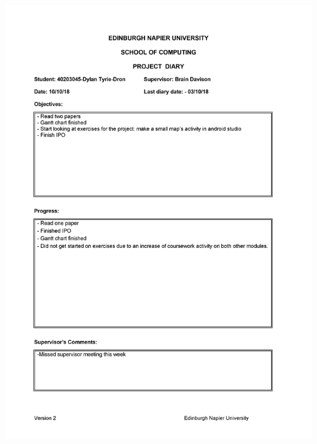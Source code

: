 \documentclass[12pt,a4paper]{article}
\begin{document}
\begin{appendices}
\includegraphics[width=\textwidth,height=\textheight,keepaspectratio]{diary2.png}
\newpage

\end{appendices}
\end{document}
